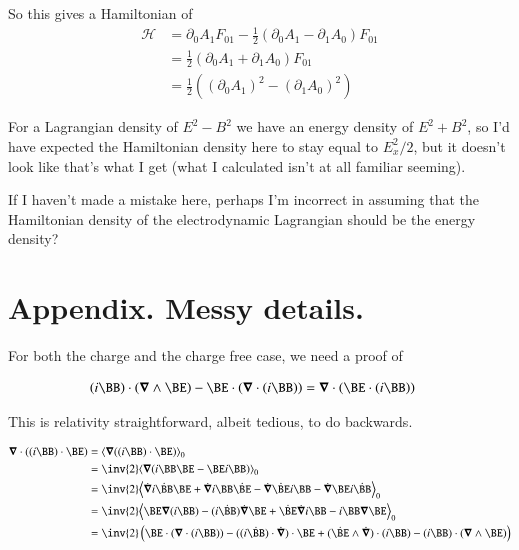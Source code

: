 \documentclass{article}
\begin{document}
So this gives a Hamiltonian of
\begin{align*}
\mathcal{H}
&= \partial_0 A_1 F_{01} - \frac{1}{2}(\partial_0 A_1 - \partial_1 A_0)F_{01} \\
&= \frac{1}{2} (\partial_0 A_1 + \partial_1 A_0 )F_{01} \\
&= \frac{1}{2} ((\partial_0 A_1)^2 - (\partial_1 A_0)^2 )
\end{align*}

For a Lagrangian density of $E^2 - B^2$ we have an energy density of $E^2 + B^2$, so I'd have expected the Hamiltonian density here to stay equal to $E_x^2/2$, but it 
doesn't look like that's what I get (what I calculated isn't at all familiar seeming).

If I haven't made a mistake here, perhaps I'm incorrect in assuming that the Hamiltonian density of the electrodynamic Lagrangian should be the energy density?

\section{ Appendix.  Messy details. }

For both the charge and the charge free case, we need a proof of 

\begin{align*}
(i\BB) \cdot (\spacegrad \wedge \BE) - \BE \cdot (\spacegrad \cdot (i \BB)) 
&= \spacegrad \cdot (\BE \cdot (i\BB)) 
\end{align*}

This is relativity straightforward, albeit tedious, to do backwards.

\begin{align*}
\spacegrad \cdot ((i \BB) \cdot \BE)
&= \gpgradezero{ \spacegrad ((i \BB) \cdot \BE)} \\
&= \inv{2} \gpgradezero{ \spacegrad ( i \BB \BE - \BE i \BB ) } \\
&= \inv{2} \gpgradezero{ 
  \dot{\spacegrad} i \dot{\BB} \BE 
+ \dot{\spacegrad} i \BB \dot{\BE}
- \dot{\spacegrad} \dot{\BE} i \BB 
- \dot{\spacegrad} \BE i \dot{\BB}
} \\
&= \inv{2} \gpgradezero{ 
  \BE \spacegrad (i \BB) - (i\dot{\BB}) \dot{\spacegrad} \BE
+ \dot{\BE} \dot{\spacegrad} i \BB - i \BB \spacegrad \BE
} \\
&= \inv{2} \left(
  \BE \cdot (\spacegrad \cdot (i \BB)) - ((i\dot{\BB}) \cdot \dot{\spacegrad}) \cdot \BE
+ (\dot{\BE} \wedge \dot{\spacegrad}) \cdot (i \BB) - (i \BB) \cdot (\spacegrad \wedge \BE) 
\right)
\\
\end{align*}
\end{document}
